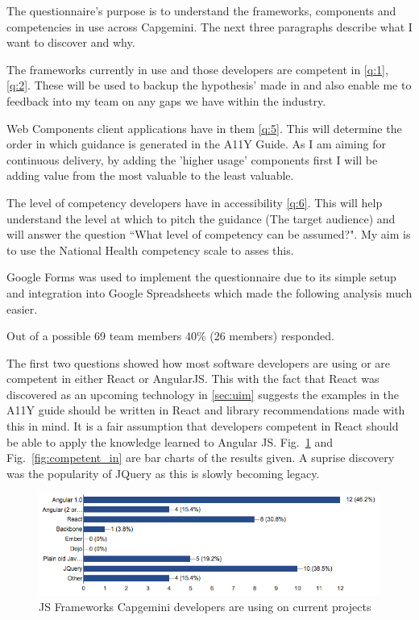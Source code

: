 The questionnaire's purpose is to understand the frameworks, components and
competencies in use across Capgemini. The next three paragraphs describe what
I want to discover and why.

The frameworks currently in use and those developers are competent in
\ref{q:1}, \ref{q:2}. These will be used to backup the hypothesis' made in
\label{sec:uim} and also enable me to feedback into my team on any gaps we
have within the industry.

Web Components client applications have in them \ref{q:5}. This will
determine the order in which guidance is generated in the A11Y Guide.
As I am aiming for continuous delivery, by adding the 'higher usage'
components first I will be adding value from the most valuable to the least
valuable.

The level of competency developers have in accessibility \ref{q:6}. This will
help understand the level at which to pitch the guidance (The target audience)
and will answer the question ``What level of competency can be assumed?". My
aim is to use the National Health competency scale \citep{NHComptency} to
asses this.

Google Forms was used to implement the questionnaire due to its simple
setup and integration into Google Spreadsheets which made the following
analysis much easier.

Out of a possible 69 team members 40\% (26 members) responded.

The first two questions showed how most software developers are using or are
competent in either React or AngularJS. This with the fact that
React was discovered as an upcoming technology in \ref{sec:uim} suggests the
examples in the A11Y guide should be written in React and library
recommendations made with this in mind. It is a fair assumption that
developers competent in React should be able to apply the knowledge learned
to Angular JS. Fig.~\ref{fig:current_proj} and Fig.~\ref{fig:competent_in}
are bar charts of the results given. A suprise discovery was the popularity
of JQuery as this is slowly becoming legacy.

\begin{figure}[H]
\centering
\centering
\includegraphics[width=\textwidth]{figures/questions/frameworks_in_use}
\captionsetup{justification=centering}
\caption{JS Frameworks Capgemini developers are using on current projects
\label{fig:current_proj}}
\end{figure}

